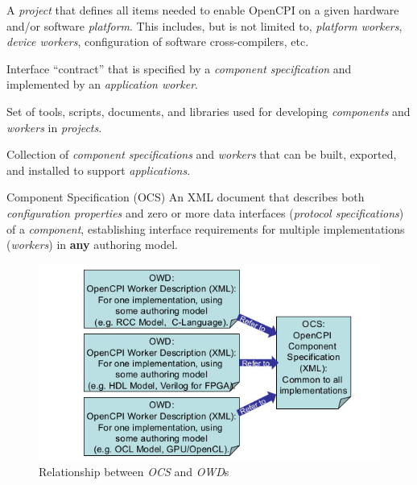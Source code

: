 \begin{description}[style=nextline]
\item[Board Support Package]
A \textit{project} that defines all items needed to enable OpenCPI on a given hardware and/or software \textit{platform}. This includes, but is not limited to, \textit{platform workers}, \textit{device workers}, configuration of software cross-compilers, etc.

\item[Component]
Interface ``contract'' that is specified by a \textit{component specification} and implemented by an \textit{application worker}.

\item[Component Development Kit]
Set of tools, scripts, documents, and libraries used for developing \textit{components} and \textit{workers} in \textit{projects}.

\item[Component Library]
Collection of \textit{component specifications} and \textit{workers} that can be built, exported, and installed to support \textit{applications}.

\begin{minipage}{\textwidth}
\item[Component Specification (OCS)]
An XML document that describes both \textit{configuration properties} and zero or more data interfaces (\textit{protocol specifications}) of a \textit{component}, establishing interface requirements for multiple implementations (\textit{workers}) in \textbf{any} authoring model.
\begin{figure}[H]
\begin{center}
\includegraphics{./figures/owdtoocs.jpg}
\caption{Relationship between \textit{OCS} and \textit{OWD}s}
\label{fig:relations}
\end{center}
\end{figure}
\end{minipage}


\end{description}
